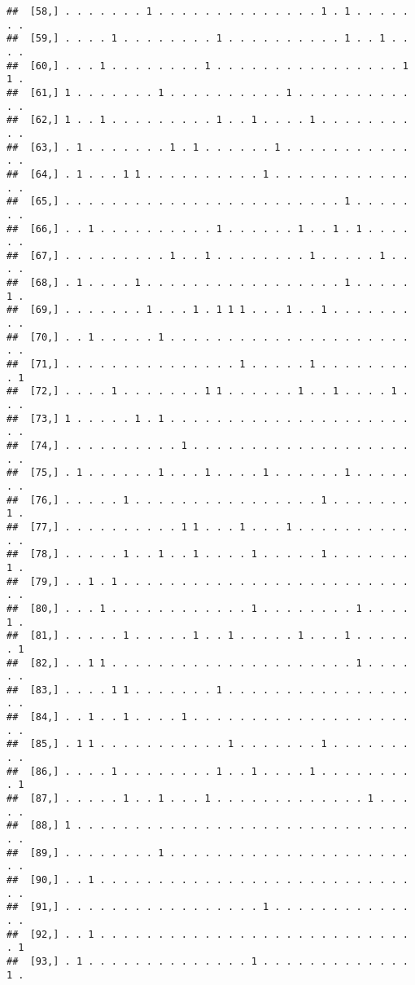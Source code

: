 \documentclass{article}\usepackage[]{graphicx}\usepackage[]{color}
\makeatletter
\newenvironment{kframe}{%
 \def\at@end@of@kframe{}%
 \ifinner\ifhmode%
  \def\at@end@of@kframe{\end{minipage}}%
  \begin{minipage}{\columnwidth}%
 \fi\fi%
 \def\FrameCommand##1{\hskip\@totalleftmargin \hskip-\fboxsep
 \colorbox{shadecolor}{##1}\hskip-\fboxsep
     \hskip-\linewidth \hskip-\@totalleftmargin \hskip\columnwidth}%
 \MakeFramed {\advance\hsize-\width
   \@totalleftmargin\z@ \linewidth\hsize
   \@setminipage}}%
 {\par\unskip\endMakeFramed%
 \at@end@of@kframe}
\newenvironment{knitrout}{}{} %
\makeatother
\begin{document}
\begin{knitrout}
\begin{kframe}
\begin{verbatim}
##  [58,] . . . . . . . 1 . . . . . . . . . . . . . . 1 . 1 . . . . . . .
##  [59,] . . . . 1 . . . . . . . . 1 . . . . . . . . . . 1 . . 1 . . . .
##  [60,] . . . 1 . . . . . . . . 1 . . . . . . . . . . . . . . . . 1 1 .
##  [61,] 1 . . . . . . . 1 . . . . . . . . . . 1 . . . . . . . . . . . .
##  [62,] 1 . . 1 . . . . . . . . . 1 . . 1 . . . . 1 . . . . . . . . . .
##  [63,] . 1 . . . . . . . 1 . 1 . . . . . . 1 . . . . . . . . . . . . .
##  [64,] . 1 . . . 1 1 . . . . . . . . . . 1 . . . . . . . . . . . . . .
##  [65,] . . . . . . . . . . . . . . . . . . . . . . . . 1 . . . . . . .
##  [66,] . . 1 . . . . . . . . . . 1 . . . . . . 1 . . 1 . 1 . . . . . .
##  [67,] . . . . . . . . . 1 . . 1 . . . . . . . . 1 . . . . . 1 . . . .
##  [68,] . 1 . . . . 1 . . . . . . . . . . . . . . . . . 1 . . . . . 1 .
##  [69,] . . . . . . . 1 . . . 1 . 1 1 1 . . . 1 . . 1 . . . . . . . . .
##  [70,] . . 1 . . . . . 1 . . . . . . . . . . . . . . . . . . . . . . .
##  [71,] . . . . . . . . . . . . . . . 1 . . . . . 1 . . . . . . . . . 1
##  [72,] . . . . 1 . . . . . . . 1 1 . . . . . . 1 . . 1 . . . . 1 . . .
##  [73,] 1 . . . . . 1 . 1 . . . . . . . . . . . . . . . . . . . . . . .
##  [74,] . . . . . . . . . . 1 . . . . . . . . . . . . . . . . . . . . .
##  [75,] . 1 . . . . . . 1 . . . 1 . . . . 1 . . . . . . 1 . . . . . . .
##  [76,] . . . . . 1 . . . . . . . . . . . . . . . . 1 . . . . . . . 1 .
##  [77,] . . . . . . . . . . 1 1 . . . 1 . . . 1 . . . . . . . . . . . .
##  [78,] . . . . . 1 . . 1 . . 1 . . . . 1 . . . . . 1 . . . . . . . 1 .
##  [79,] . . 1 . 1 . . . . . . . . . . . . . . . . . . . . . . . . . . .
##  [80,] . . . 1 . . . . . . . . . . . . 1 . . . . . . . . 1 . . . . 1 .
##  [81,] . . . . . 1 . . . . . 1 . . 1 . . . . . 1 . . . 1 . . . . . . 1
##  [82,] . . 1 1 . . . . . . . . . . . . . . . . . . . . . 1 . . . . . .
##  [83,] . . . . 1 1 . . . . . . . 1 . . . . . . . . . . . . . . . . . .
##  [84,] . . 1 . . 1 . . . . 1 . . . . . . . . . . . . . . . . . . . . .
##  [85,] . 1 1 . . . . . . . . . . . 1 . . . . . . . 1 . . . . . . . . .
##  [86,] . . . . 1 . . . . . . . . 1 . . 1 . . . . 1 . . . . . . . . . 1
##  [87,] . . . . . 1 . . 1 . . . 1 . . . . . . . . . . . . . 1 . . . . .
##  [88,] 1 . . . . . . . . . . . . . . . . . . . . . . . . . . . . . . .
##  [89,] . . . . . . . . 1 . . . . . . . . . . . . . . . . . . . . . . .
##  [90,] . . 1 . . . . . . . . . . . . . . . . . . . . . . . . . . . . .
##  [91,] . . . . . . . . . . . . . . . . . 1 . . . . . . . . . . . . . .
##  [92,] . . 1 . . . . . . . . . . . . . . . . . . . . . . . . . . . . 1
##  [93,] . 1 . . . . . . . . . . . . . . 1 . . . . . . . . . . . . . 1 .

\end{verbatim}
\end{kframe}
\end{knitrout}
\end{document}
